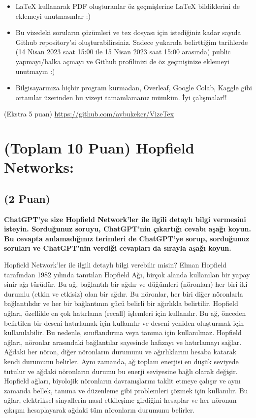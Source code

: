 \documentclass[11pt]{article}
\begin{document}
\begin{itemize}
    \item LaTeX kullanarak PDF oluşturanlar öz geçmişlerine LaTeX bildiklerini de eklemeyi unutmasınlar :)
    \item Bu vizedeki soruların çözümleri ve tex dosyası için istediğiniz kadar sayıda Github repository'si oluşturabilirsiniz. Sadece yukarıda belirttiğim tarihlerde (14 Nisan 2023 saat 15:00 ile 15 Nisan 2023 saat 15:00 arasında) public yapmayı/halka açmayı ve Github profilinizi de öz geçmişinize eklemeyi unutmayın :)
    \item Bilgisayarınıza hiçbir program kurmadan, Overleaf, Google Colab, Kaggle gibi ortamlar üzerinden bu vizeyi tamamlamanız mümkün. İyi çalışmalar!!
\end{itemize}

(Ekstra 5 puan) \url{https://github.com/aybukekcr/VizeTex}

\newpage
\section{(Toplam 10 Puan) Hopfield Networks:}

\subsection{(2 Puan)} \textbf{ChatGPT’ye size Hopfield Network’ler ile ilgili detaylı bilgi vermesini isteyin. Sorduğunuz soruyu, ChatGPT'nin çıkartığı cevabı aşağı koyun. Bu cevapta anlamadığınız terimleri de ChatGPT’ye sorup, sorduğunuz soruları ve ChatGPT’nin verdiği cevapları da sırayla aşağı koyun.}

Hopfield Network'ler ile ilgili detaylı bilgi verebilir misin?
Elman Hopfield tarafından 1982 yılında tanıtılan Hopfield Ağı, birçok alanda kullanılan bir yapay sinir ağı türüdür. Bu ağ, bağlantılı bir ağdır ve düğümleri (nöronları) her biri iki durumlu (etkin ve etkisiz) olan bir ağdır. Bu nöronlar, her biri diğer nöronlarla bağlantılıdır ve her bir bağlantının gücü belirli bir ağırlıkla belirtilir.
Hopfield ağları, özellikle en çok hatırlama (recall) işlemleri için kullanılır. Bu ağ, önceden belirtilen bir deseni hatırlamak için kullanılır ve deseni yeniden oluşturmak için kullanılabilir. Bu nedenle, sınıflandırma veya tanıma için kullanılmaz.
Hopfield ağları, nöronlar arasındaki bağlantılar sayesinde hafızayı ve hatırlamayı sağlar. Ağdaki her nöron, diğer nöronların durumunu ve ağırlıklarını hesaba katarak kendi durumunu belirler. Aynı zamanda, ağ toplam enerjisi en düşük seviyede tutulur ve ağdaki nöronların durumu bu enerji seviyesine bağlı olarak değişir.
Hopfield ağları, biyolojik nöronların davranışlarını taklit etmeye çalışır ve aynı zamanda bellek, tanıma ve düzenleme gibi problemleri çözmek için kullanılır. Bu ağlar, elektriksel sinyallerin nasıl etkileşime girdiğini hesaplar ve her nöronun çıkışını hesaplayarak ağdaki tüm nöronların durumunu belirler.
\end{document}

